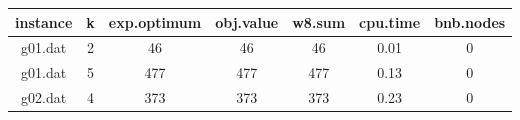 \begin{tabular}{ c | c | c | c | c | c | c }
	instance & k & exp.optimum & obj.value & w8.sum & cpu.time & bnb.nodes \\ 
	\hline
	g01.dat & 2 & 46 & 46 & 46 & 0.01 & 0 \\
	g01.dat & 5 & 477 & 477 & 477 & 0.13 & 0 \\
	g02.dat & 4 & 373 & 373 & 373 & 0.23 & 0 \\
\end{tabular}

